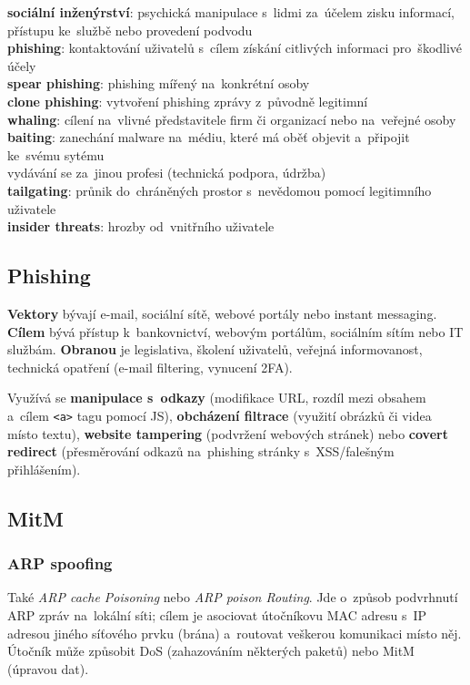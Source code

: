 \textbf{sociální inženýrství}: psychická manipulace s~lidmi za~účelem zisku informací, přístupu ke~službě nebo provedení podvodu \\
\textbf{phishing}: kontaktování uživatelů s~cílem získání citlivých informaci pro~škodlivé účely \\
\textbf{spear phishing}: phishing mířený na~konkrétní osoby \\
\textbf{clone phishing}: vytvoření phishing zprávy z~původně legitimní \\
\textbf{whaling}: cílení na~vlivné představitele firm či organizací nebo na~veřejné osoby \\
\textbf{baiting}: zanechání malware na~médiu, které má oběť objevit a~připojit ke~svému sytému \\
vydávání se za~jinou profesi (technická podpora, údržba) \\
\textbf{tailgating}: průnik do~chráněných prostor s~nevědomou pomocí legitimního uživatele \\
\textbf{insider threats}: hrozby od~vnitřního uživatele

\subsection*{Phishing}

\textbf{Vektory} bývají e-mail, sociální sítě, webové portály nebo instant messaging. \textbf{Cílem} bývá přístup k~bankovnictví, webovým portálům, sociálním sítím nebo IT službám. \textbf{Obranou} je legislativa, školení uživatelů, veřejná informovanost, technická opatření (e-mail filtering, vynucení 2FA).

Využívá se \textbf{manipulace s~odkazy} (modifikace URL, rozdíl mezi obsahem a~cílem \texttt{<a>} tagu pomocí JS), \textbf{obcházení filtrace} (využití obrázků či videa místo textu), \textbf{website tampering} (podvržení webových stránek) nebo \textbf{covert redirect} (přesměrování odkazů na~phishing stránky s~XSS/falešným přihlášením).

\subsection{MitM}

\subsubsection{ARP spoofing}

Také \emph{ARP cache Poisoning} nebo \emph{ARP poison Routing}. Jde o~způsob podvrhnutí ARP zpráv na~lokální síti; cílem je asociovat útočníkovu MAC adresu s~IP adresou jiného síťového prvku (brána) a~routovat veškerou komunikaci místo něj. Útočník může způsobit DoS (zahazováním některých paketů) nebo MitM (úpravou dat).

